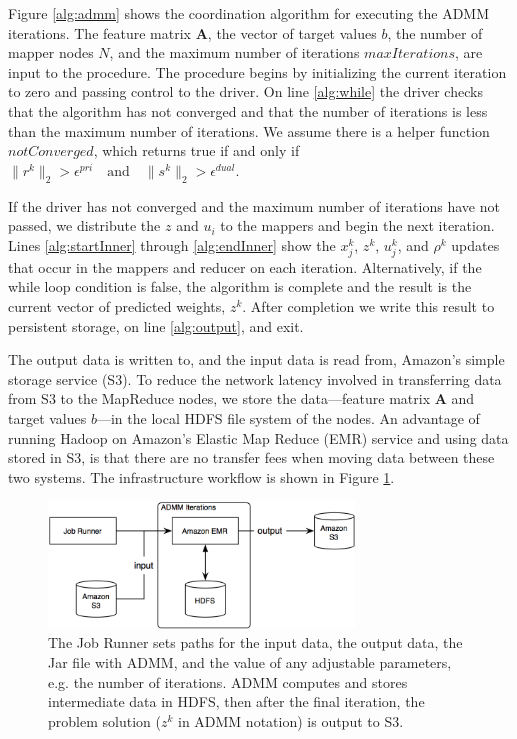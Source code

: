 \documentclass[10pt, conference, compsocconf]{IEEEtran}
\begin{document}
Figure \ref{alg:admm} shows the coordination algorithm for executing the ADMM iterations.  The feature matrix $\mathbf{A}$, the
vector of target values $b$, the number of mapper nodes $N$, and the maximum number of iterations $maxIterations$, are input to the procedure.  The procedure begins by initializing the current iteration to zero and passing control to the driver.  On line \ref{alg:while} the driver checks that the algorithm has not converged and that the number of iterations is less than the maximum number of iterations.  We assume there is a helper function $notConverged$, which returns true if and only if $\|r^k\|_2 > \epsilon^{pri} \quad\text{and}\quad \|s^k\|_2 > \epsilon^{dual}.$

If the driver has not converged and the maximum number of iterations have not passed, we distribute the $z$ and $u_i$ to the mappers and begin the next iteration.  Lines \ref{alg:startInner} through \ref{alg:endInner} show the $x_j^k$, $z^k$, $u_j^k$, and $\rho^k$ updates that occur in the mappers and reducer on each iteration.  Alternatively, if the while loop condition is false, the algorithm is complete and the result is the current vector of predicted weights, $z^k$.  After completion we write this result to persistent storage, on line \ref{alg:output}, and exit.

The output data is written to, and the input data is read from, Amazon's simple storage service (S3). To reduce the network latency involved in transferring data from S3 to the MapReduce nodes, we store the data---feature matrix $\mathbf{A}$ and target values $b$---in the local HDFS file system of the nodes.  An advantage of running Hadoop on Amazon's Elastic Map Reduce (EMR) service and using data stored in S3, is that there are no transfer fees when moving data between these two systems.  The infrastructure workflow is shown in Figure \ref{fig:workflow}.

\begin{figure}[!t]
\centering
\includegraphics[width=3.2in]{aws_implementation}
\caption{The Job Runner sets paths for the input data, the output data, the Jar file with ADMM, and the value of any adjustable parameters, e.g. the number of iterations.  ADMM computes and stores intermediate data in HDFS, then after the final iteration, the problem solution ($z^k$ in ADMM notation) is output to S3.}
\label{fig:workflow}
\end{figure}
\end{document}
